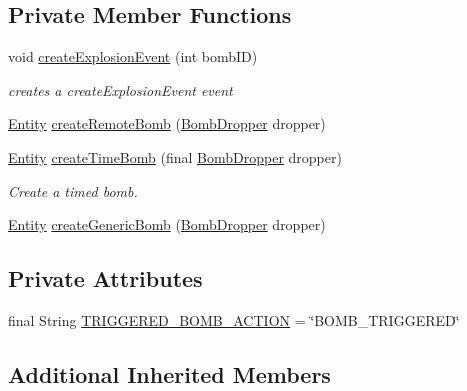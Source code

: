 \subsection*{Private Member Functions}
\begin{DoxyCompactItemize}
\item 
void \hyperlink{classbr_1_1unb_1_1unbomber_1_1systems_1_1_bomb_system_a05ad21f7aae0aed9b71bd021112e875a}{create\+Explosion\+Event} (int bomb\+I\+D)
\begin{DoxyCompactList}\small\item\em creates a create\+Explosion\+Event event \end{DoxyCompactList}\item 
\hyperlink{classbr_1_1unb_1_1unbomber_1_1core_1_1_entity}{Entity} \hyperlink{classbr_1_1unb_1_1unbomber_1_1systems_1_1_bomb_system_a3f5f3a7f4a7f0451a105c6cd98ada694}{create\+Remote\+Bomb} (\hyperlink{classbr_1_1unb_1_1unbomber_1_1component_1_1_bomb_dropper}{Bomb\+Dropper} dropper)
\item 
\hyperlink{classbr_1_1unb_1_1unbomber_1_1core_1_1_entity}{Entity} \hyperlink{classbr_1_1unb_1_1unbomber_1_1systems_1_1_bomb_system_a89cb29bc0ee35d20bc03bd63aa2ba5e0}{create\+Time\+Bomb} (final \hyperlink{classbr_1_1unb_1_1unbomber_1_1component_1_1_bomb_dropper}{Bomb\+Dropper} dropper)
\begin{DoxyCompactList}\small\item\em Create a timed bomb. \end{DoxyCompactList}\item 
\hyperlink{classbr_1_1unb_1_1unbomber_1_1core_1_1_entity}{Entity} \hyperlink{classbr_1_1unb_1_1unbomber_1_1systems_1_1_bomb_system_a7645b35ae4c83053bf80340e246d789e}{create\+Generic\+Bomb} (\hyperlink{classbr_1_1unb_1_1unbomber_1_1component_1_1_bomb_dropper}{Bomb\+Dropper} dropper)
\end{DoxyCompactItemize}
\subsection*{Private Attributes}
\begin{DoxyCompactItemize}
\item 
final String \hyperlink{classbr_1_1unb_1_1unbomber_1_1systems_1_1_bomb_system_a0908ea540a88c9172ab9a55882a8ea51}{T\+R\+I\+G\+G\+E\+R\+E\+D\+\_\+\+B\+O\+M\+B\+\_\+\+A\+C\+T\+I\+O\+N} = \char`\"{}B\+O\+M\+B\+\_\+\+T\+R\+I\+G\+G\+E\+R\+E\+D\char`\"{}
\end{DoxyCompactItemize}
\subsection*{Additional Inherited Members}


